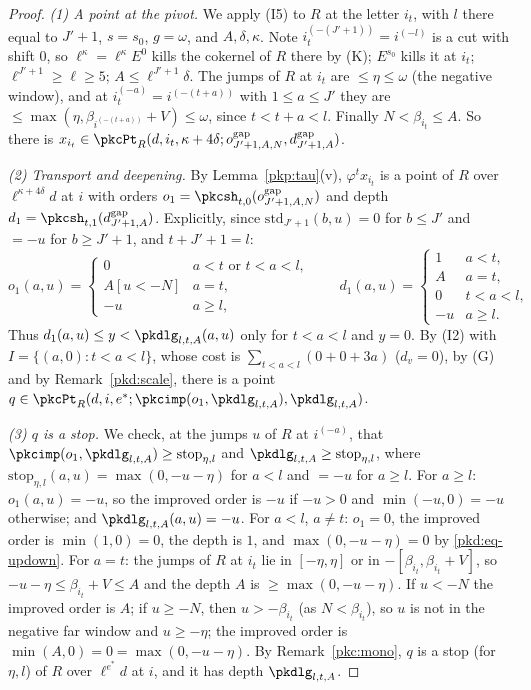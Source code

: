 \documentclass[10pt]{amsart}
\theoremstyle{definition}
\theoremstyle{remark}
\begin{document}
\begin{proof}
\emph{(1) A point at the pivot.} We apply (I5) to $R$ at the letter $i_t$, with $l$ there equal to
$J'+1$, $s=s_0$, $g=\omega$, and $A,\delta,\kappa$. Note $i_t^{(-(J'+1))}=i^{(-l)}$ is a cut with shift
$0$, so $\ell^\kappa=\ell^\kappa E^0$ kills the cokernel of $R$ there by (K); $E^{s_0}$ kills it at
$i_t$; $\ell^{J'+1}\ge\ell\ge5$; $A\le\ell^{J'+1}\delta$. The jumps of $R$ at $i_t$ are $\le\eta\le\omega$ (the
negative window), and at $i_t^{(-a)}=i^{(-(t+a))}$ with $1\le a\le J'$ they are $\le\max(\eta,
\beta_{i^{(-(t+a))}}+V)\le\omega$, since $t<t+a<l$. Finally $N<\beta_{i_t}\le A$. So there is
$x_{i_t}\in\pkcPt_R(d,i_t,\kappa+4\delta;o^{\mathrm{gap}}_{J'+1,A,N},d^{\mathrm{gap}}_{J'+1,A})$.

\emph{(2) Transport and deepening.} By Lemma~\ref{pkp:tau}(v), $\varphi^tx_{i_t}$ is a point of $R$ over
$\ell^{\kappa+4\delta}d$ at $i$ with orders $o_1=\pkcsh_{t,0}(o^{\mathrm{gap}}_{J'+1,A,N})$ and depth
$d_1=\pkcsh_{t,1}(d^{\mathrm{gap}}_{J'+1,A})$. Explicitly, since $\mathrm{std}_{J'+1}(b,u)=0$ for
$b\le J'$ and $=-u$ for $b\ge J'+1$, and $t+J'+1=l$:
\[
o_1(a,u)=\begin{cases}0&a<t\text{ or }t<a<l,\\ A[u<-N]&a=t,\\ -u&a\ge l,\end{cases}\qquad
d_1(a,u)=\begin{cases}1&a<t,\\ A&a=t,\\ 0&t<a<l,\\ -u&a\ge l.\end{cases}
\]
Thus $d_1(a,u)\le y<\pkdlg_{l,t,A}(a,u)$ only for $t<a<l$ and $y=0$. By (I2) with
$I=\{(a,0):t<a<l\}$, whose cost is $\sum_{t<a<l}(0+0+3a)$ ($d_v=0$), by (G) and by
Remark~\ref{pkd:scale}, there is a point
$q\in\pkcPt_R(d,i,e^*;\pkcimp(o_1,\pkdlg_{l,t,A}),\pkdlg_{l,t,A})$.

\emph{(3) $q$ is a stop.} We check, at the jumps $u$ of $R$ at $i^{(-a)}$, that
$\pkcimp(o_1,\pkdlg_{l,t,A})\ge\mathrm{stop}_{\eta,l}$ and $\pkdlg_{l,t,A}\ge\mathrm{stop}_{\eta,l}$,
where $\mathrm{stop}_{\eta,l}(a,u)=\max(0,-u-\eta)$ for $a<l$ and $=-u$ for $a\ge l$.
For $a\ge l$: $o_1(a,u)=-u$, so the improved order is $-u$ if $-u>0$ and $\min(-u,0)=-u$ otherwise;
and $\pkdlg_{l,t,A}(a,u)=-u$. For $a<l$, $a\ne t$: $o_1=0$, the improved order is $\min(1,0)=0$, the
depth is $1$, and $\max(0,-u-\eta)=0$ by \eqref{pkd:eq-updown}. For $a=t$: the jumps of $R$ at $i_t$ lie
in $[-\eta,\eta]$ or in $-[\beta_{i_t},\beta_{i_t}+V]$, so $-u-\eta\le\beta_{i_t}+V\le A$ and the depth $A$ is
$\ge\max(0,-u-\eta)$. If $u<-N$ the improved order is $A$; if $u\ge-N$, then $u>-\beta_{i_t}$ (as
$N<\beta_{i_t}$), so $u$ is not in the negative far window and $u\ge-\eta$; the improved order is
$\min(A,0)=0=\max(0,-u-\eta)$. By Remark~\ref{pkc:mono}, $q$ is a stop (for $\eta,l$) of $R$ over
$\ell^{e^*}d$ at $i$, and it has depth $\pkdlg_{l,t,A}$.


\end{proof}
\end{document}

